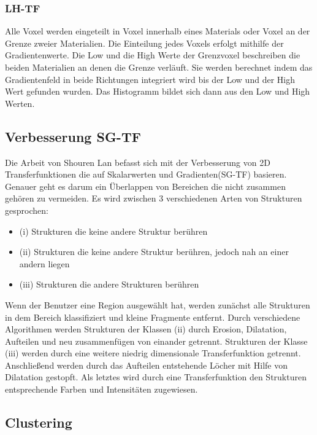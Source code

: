 \documentclass{article}
\begin{document}
\subsubsection{LH-TF}

Alle Voxel werden eingeteilt in Voxel innerhalb eines Materials oder Voxel an der Grenze zweier Materialien. Die Einteilung jedes Voxels erfolgt mithilfe der Gradientenwerte. Die Low und die High Werte der Grenzvoxel beschreiben die beiden Materialien an denen die Grenze verläuft. Sie werden berechnet indem das Gradientenfeld in beide Richtungen integriert wird bis der Low und der High Wert gefunden wurden. 
\newline
Das Histogramm bildet sich dann aus den Low und High Werten. \cite{sereda2006visualization}


\subsection{Verbesserung SG-TF}

Die Arbeit von Shouren Lan \cite{lan2017improving} befasst sich mit der Verbesserung von 2D Transferfunktionen die auf Skalarwerten und Gradienten(SG-TF) basieren. Genauer geht es darum ein Überlappen von Bereichen die nicht zusammen gehören zu vermeiden.
\newline
Es wird zwischen 3 verschiedenen Arten von Strukturen gesprochen:
\begin{itemize}
\item (i) Strukturen die keine andere Struktur berühren
\item (ii) Strukturen die keine andere Struktur berühren, jedoch nah an einer andern liegen
\item (iii) Strukturen die andere Strukturen berühren
\end{itemize} 
Wenn der Benutzer eine Region ausgewählt hat, werden zunächst alle Strukturen in dem Bereich klassifiziert und kleine Fragmente entfernt. Durch verschiedene Algorithmen werden Strukturen der Klassen (ii) durch Erosion, Dilatation, Aufteilen und neu zusammenfügen von einander getrennt. Strukturen der Klasse (iii) werden durch eine weitere niedrig dimensionale Transferfunktion getrennt. Anschließend werden durch das Aufteilen entstehende Löcher mit Hilfe von Dilatation gestopft. Als letztes wird durch eine Transferfunktion den Strukturen entsprechende Farben und Intensitäten zugewiesen.


\subsection{Clustering}
\end{document}
